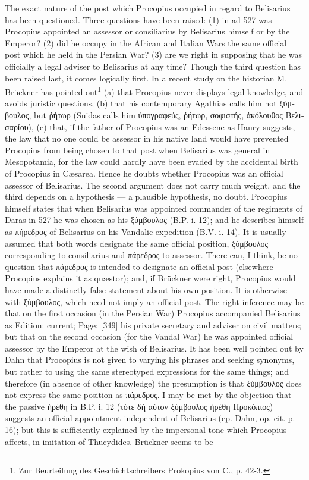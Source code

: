 The exact nature of the post which Procopius occupied in regard to Belisarius has been questioned. Three questions have been raised: (1) in ad 527 was Procopius appointed an assessor or consiliarius by Belisarius himself or by the Emperor? (2) did he occupy in the African and Italian Wars the same official post which he held in the Persian War? (3) are we right in supposing that he was officially a legal adviser to Belisarius at any time? Though the third question has been raised last, it comes logically first. In a recent study on the historian M. Brückner has pointed out\footnote{Zur Beurteilung des Geschichtschreibers Prokopius von C., p. 42-3.} (a) that Procopius never displays legal knowledge, and avoids juristic questions, (b) that his contemporary Agathias calls him not \textgreek{ξύμβουλος}, but \textgreek{\texthebrew{ῥ}ήτωρ} (Suidas calls him \textgreek{\texthebrew{ὑ}πογραφεύς, \texthebrew{ῥ}ήτωρ, σοφιστής, \texthebrew{ἀ}κόλουθος Βελισαρίου}), (c) that, if the father of Procopius was an Edessene as Haury suggests, the law that no one could be assessor in his native land would have prevented Procopius from being chosen to that post when Belisarius was general in Mesopotamia, for the law could hardly have been evaded by the accidental birth of Procopius in Cæsarea. Hence he doubts whether Procopius was an official assessor of Belisarius. The second argument does not carry much weight, and the third depends on a hypothesis \texthebrew{—} a plausible hypothesis, no doubt. Procopius himself states that when Belisarius was appointed commander of the regiments of Daras in 527 he was chosen as his \textgreek{ξύμβουλος} (B.P. i. 12); and he describes himself as \textgreek{πήρεδρος} of Belisarius on his Vandalic expedition (B.V. i. 14). It is usually assumed that both words designate the same official position, \textgreek{ξύμβουλος} corresponding to consiliarius and \textgreek{πάρεδρος} to assessor. There can, I think, be no question that \textgreek{πάρεδρος} is intended to designate an official post (elsewhere Procopius explains it as quæstor); and, if Brückner were right, Procopius would have made a distinctly false statement about his own position. It is otherwise with \textgreek{ξύμβουλος}, which need not imply an official post. The right inference may be that on the first occasion (in the Persian War) Procopius accompanied Belisarius as Edition: current; Page: [349] his private secretary and adviser on civil matters; but that on the second occasion (for the Vandal War) he was appointed official assessor by the Emperor at the wish of Belisarius. It has been well pointed out by Dahn that Procopius is not given to varying his phrases and seeking synonyms, but rather to using the same stereotyped expressions for the same things; and therefore (in absence of other knowledge) the presumption is that \textgreek{ξύμβουλος} does not express the same position as \textgreek{πάρεδρος}. I may be met by the objection that the passive \textgreek{\texthebrew{ἡ}ρέθη} in B.P. i. 12 (\textgreek{τότε δ\texthebrew{ὴ} α\texthebrew{ὐ}τον ξύμβουλος \texthebrew{ἡ}ρέθη Προκόπιος}) suggests an official appointment independent of Belisarius (cp. Dahn, op. cit. p. 16); but this is sufficiently explained by the impersonal tone which Procopius affects, in imitation of Thucydides. Brückner seems to be 